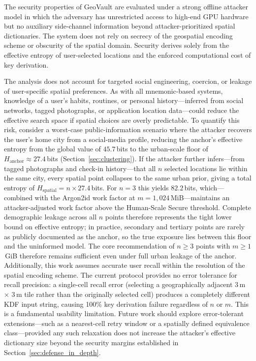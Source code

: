 \documentclass[journal,article,accept,pdftex,moreauthors]{Definitions/mdpi}
\begin{document}
The security properties of GeoVault are evaluated under a strong offline attacker model in which the adversary has unrestricted access to high-end GPU hardware but no auxiliary side-channel information beyond attacker-prioritized spatial dictionaries. The system does not rely on secrecy of the geospatial encoding scheme or obscurity of the spatial domain. Security derives solely from the effective entropy of user-selected locations and the enforced computational cost of key derivation.

The analysis does not account for targeted social engineering, coercion, or leakage of user-specific spatial preferences. As with all mnemonic-based systems, knowledge of a user's habits, routines, or personal history---inferred from social networks, tagged photographs, or application location data---could reduce the effective search space if spatial choices are overly predictable. To quantify this risk, consider a worst-case public-information scenario where the attacker recovers the user's home city from a social-media profile, reducing the anchor's effective entropy from the global value of $45.7$\,bits to the urban-scale floor of $H_\text{anchor}\approx 27.4$\,bits (Section~\ref{sec:clustering}). If the attacker further infers---from tagged photographs and check-in history---that all $n$ selected locations lie within the same city, every spatial point collapses to the same urban prior, giving a total entropy of $H_\text{spatial} = n\times 27.4$\,bits. For $n=3$ this yields $82.2$\,bits, which---combined with the Argon2id work factor at $m=1{,}024$\,MiB---maintains an attacker-adjusted work factor above the Human-Scale Secure threshold. Complete demographic leakage across all $n$ points therefore represents the tight lower bound on effective entropy; in practice, secondary and tertiary points are rarely as publicly documented as the anchor, so the true exposure lies between this floor and the uninformed model. The core recommendation of $n\geq 3$ points with $m\geq 1$\,GiB therefore remains sufficient even under full urban leakage of the anchor. Additionally, this work assumes accurate user recall within the resolution of the spatial encoding scheme. The current protocol provides no error tolerance for recall precision: a single-cell recall error (selecting a geographically adjacent 3\,m $\times$ 3\,m tile rather than the originally selected cell) produces a completely different KDF input string, causing 100\% key derivation failure regardless of $n$ or $m$. This is a fundamental usability limitation. Future work should explore error-tolerant extensions---such as a nearest-cell retry window or a spatially defined equivalence class---provided any such relaxation does not increase the attacker's effective dictionary size beyond the security margins established in Section~\ref{sec:defense_in_depth}.
\end{document}
